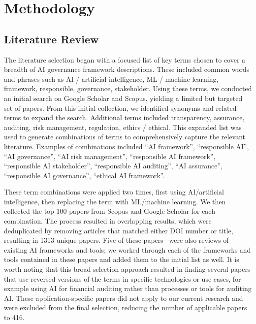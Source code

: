 \section{Methodology}
\subsection{Literature Review}
 The literature selection began with a focused list of key terms chosen to cover a breadth of AI governance framework descriptions. These included common words and phrases such as AI / artificial intelligence, ML / machine learning, framework, responsible, governance, stakeholder. Using these terms, we conducted an initial search on Google Scholar and Scopus, yielding a limited but targeted set of papers. From this initial collection, we identified synonyms and related terms to expand the search. 
Additional terms included transparency, assurance, auditing, risk management, regulation, ethics / ethical. This expanded list was used to generate combinations of terms to comprehensively capture the relevant literature. 
Examples of combinations included ``AI framework'', ``responsible AI'', ``AI governance'', ``AI risk management'', ``responsible AI framework'', ``responsible  AI stakeholder'', ``responsible AI auditing'', ``AI assurance'', ``responsible AI governance'', ``ethical AI framework''.

These term combinations were applied two times, first using AI/artificial intelligence, then replacing the term with ML/machine learning. 
We then collected the top 100 papers from Scopus and Google Scholar for each combination. The process resulted in overlapping results, which were deduplicated by removing articles that matched either DOI number or title, resulting in 1313 unique papers.
Five of these papers~\cite{Ayling2022, Ortega2024, Prem2023, Ojewale2024, Morley2019} were also reviews of existing AI frameworks and tools; we worked through each of the frameworks and tools contained in these papers and added them to the initial list as well.
It is worth noting that this broad selection approach resulted in finding several papers that use reversed versions of the terms in specific technologies or use cases, for example using AI for financial auditing rather than processes or tools for auditing AI. These application-specific papers did not apply to our current research and were excluded from the final selection, reducing the number of applicable papers to 416. 

